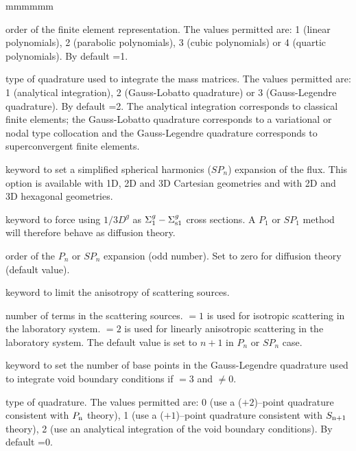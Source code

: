 \begin{ListeDeDescription}{mmmmmm}
\item[\dusa{ielem}] order of the finite element representation.  The values
permitted are: 1 (linear polynomials), 2 (parabolic polynomials), 3 (cubic
polynomials) or 4 (quartic polynomials). By default =1.

\item[\dusa{icol}] type of quadrature used to  integrate the mass matrices.
The values permitted are: 1 (analytical integration), 2  (Gauss-Lobatto
quadrature) or 3 (Gauss-Legendre quadrature). By default =2. The
analytical integration corresponds to classical finite elements; the
Gauss-Lobatto quadrature corresponds to a variational or nodal type
collocation and the Gauss-Legendre quadrature corresponds to superconvergent
finite elements.

\item[\moc{SPN}] keyword to set a simplified spherical harmonics ($SP_n$) expansion
of the flux.\cite{nse2005,ane10a} This option is available with 1D, 2D and 3D Cartesian geometries and with 2D and 3D
hexagonal geometries.

\item[\moc{DIFF}] keyword to force using $1/3D^{g}$ as $\Sigma_1^{g}-\Sigma_{{\rm s}1}^{g}$ cross sections. A $P_1$ or $SP_1$ method
will therefore behave as diffusion theory.

\item[\dusa{nlf}] order of the $P_n$ or $SP_n$ expansion (odd number). Set to zero for diffusion theory (default value).

\item[\moc{SCAT}] keyword to limit the anisotropy of scattering sources.

\item[\dusa{iscat}] number of terms in the scattering sources.  $=1$ is used for
isotropic scattering in the laboratory system.  $=2$ is used for
linearly anisotropic scattering in the laboratory system. The default value is set to $n+1$
in $P_n$ or $SP_n$ case.

\item[\moc{VOID}] keyword to set the number of base points in the Gauss-Legendre quadrature used to integrate
void boundary conditions if  $=3$ and  $\ne 0$.

\item[\dusa{nvd}] type of quadrature. The values
permitted are: 0 (use a ($+2$)--point quadrature consistent with $P_{\rm n}$ theory),
1 (use a ($+1$)--point quadrature consistent with $S_{{\rm n}+1}$ theory),
2 (use an analytical integration of the void boundary conditions). By default =0.


\end{ListeDeDescription}
